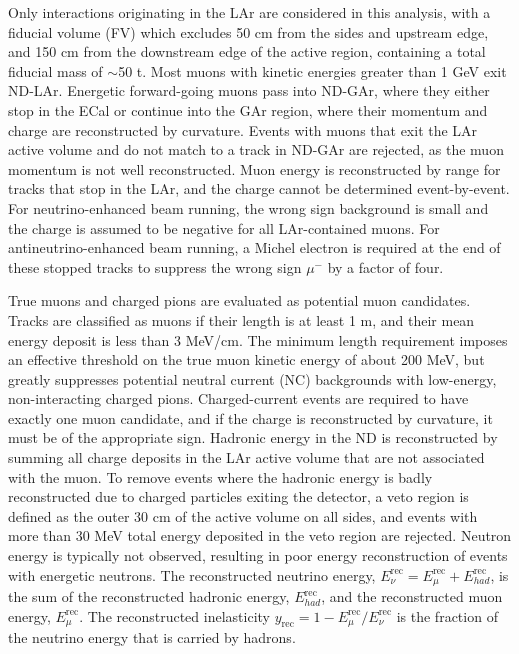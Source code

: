 Only interactions originating in the LAr are considered in this analysis, with a fiducial volume (FV) which excludes 50 cm from the sides and upstream edge, and 150 cm from the downstream edge of the active region, containing a total fiducial mass of $\sim$50 t. Most muons with kinetic energies greater than 1 GeV exit ND-LAr. Energetic forward-going muons pass into ND-GAr, where they either stop in the ECal or continue into the GAr region, where their momentum and charge are reconstructed by curvature. Events with muons that exit the LAr active volume and do not match to a track in ND-GAr are rejected, as the muon momentum is not well reconstructed. Muon energy is reconstructed by range for tracks that stop in the LAr, and the charge cannot be determined event-by-event. For neutrino-enhanced beam running, the wrong sign background is small and the charge is assumed to be negative for all LAr-contained muons. For antineutrino-enhanced beam running, a Michel electron is required at the end of these stopped tracks to suppress the wrong sign $\mu^-$ by a factor of four.

True muons and charged pions are evaluated as potential muon candidates. Tracks are classified as muons if their length is at least 1 m, and their mean energy deposit is less than 3 MeV/cm. The minimum length requirement imposes an effective threshold on the true muon kinetic energy of about 200 MeV, but greatly suppresses potential neutral current (NC) backgrounds with low-energy, non-interacting charged pions. Charged-current events are required to have exactly one muon candidate, and if the charge is reconstructed by curvature, it must be of the appropriate sign. Hadronic energy in the ND is reconstructed by summing all charge deposits in the LAr active volume that are not associated with the muon. To remove events where the hadronic energy is badly reconstructed due to charged particles exiting the detector, a veto region is defined as the outer 30 cm of the active volume on all sides, and events with more than 30 MeV total energy deposited in the veto region are rejected. Neutron energy is typically not observed, resulting in poor energy reconstruction of events with energetic neutrons. The reconstructed neutrino energy, $E_{\nu}^{\mathrm{rec}} = E_{\mu}^{\mathrm{rec}} + E_{had}^{\mathrm{rec}}$, is the sum of the reconstructed hadronic energy, $E_{had}^{\mathrm{rec}}$, and the reconstructed muon energy, $E_{\mu}^{\mathrm{rec}}$. The reconstructed inelasticity $y_{\mathrm{rec}} = 1 - E_{\mu}^{\mathrm{rec}}/E_{\nu}^{\mathrm{rec}}$ is the fraction of the neutrino energy that is carried by hadrons.


